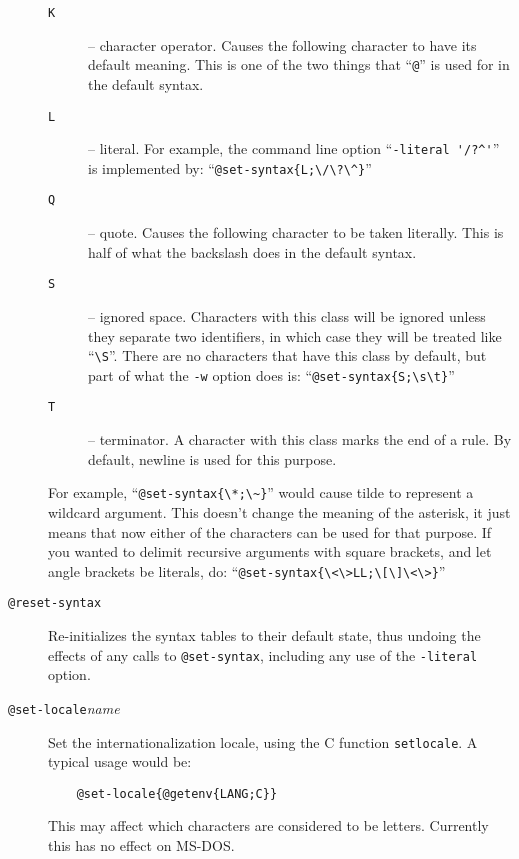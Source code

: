 \begin{description}
\begin{description}
    \item[\tt K] -- character operator.  Causes the following character
	to have its default meaning.  This is one of the two things that
	``\verb/@/'' is used for in the default syntax.
    \item[\tt L] -- literal.  For example, the command line option 
	``\verb|-literal '/?^'|'' is implemented by:
	``\verb|@set-syntax{L;\/\?\^}|''
    \item[\tt Q] -- quote.  Causes the following character to be taken
	literally.  This is half of what the backslash does in the
	default syntax.
    \item[\tt S] -- ignored space.  Characters with this class will be
	ignored unless they separate two identifiers, in which case they
	will be treated like ``\verb/\S/''.  There are no characters
	that have this class by default, but part of what the \verb/-w/
	option does is: ``\verb/@set-syntax{S;\s\t}/''
    \item[\tt T] -- terminator.  A character with this class marks the
	end of a rule.  By default, newline is used for this purpose.
 \end{description}
For example,  ``\verb/@set-syntax{\*;\~}/'' would cause tilde to
represent a wildcard argument.  This doesn't change the meaning of the
asterisk, it just means that now either of the characters can be used
for that purpose.  If you wanted to delimit recursive arguments with
square brackets, and let angle brackets be literals, do:
``\verb/@set-syntax{\<\>LL;\[\]\<\>}/''

\item[{\tt @reset-syntax\ttlb\ttrb}]
Re-initializes the syntax tables to their default state, thus undoing the
effects of any calls to \verb|@set-syntax|, including any use of the
\verb/-literal/ option.

\item[{\tt @set-locale\ttlb}{\it name}{\tt \ttrb}]
Set the internationalization locale, using the C function
{\tt setlocale}.
A typical usage would be:
\begin{verbatim}
    @set-locale{@getenv{LANG;C}}
\end{verbatim}
This may affect which characters are considered to be letters.
Currently this has no effect on MS-DOS.
\end{description}

